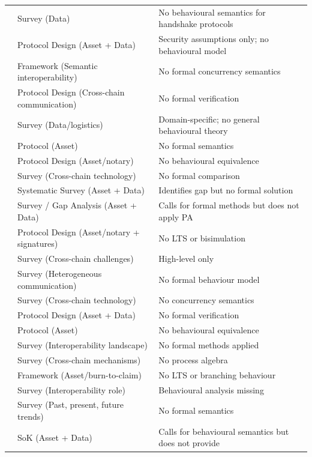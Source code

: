 \begin{longtable}[]{@{}lll@{}}
\citep{Bigiotti2025} & Survey (Data) & No behavioural semantics for
handshake protocols \\
\citep{Cheng_2024} & Protocol Design (Asset + Data) & Security
assumptions only; no behavioural model \\
\citep{sottomayor2024enterprise} & Framework (Semantic interoperability)
& No formal concurrency semantics \\
\citep{Mohammed_Abdul_2024} & Protocol Design (Cross-chain
communication) & No formal verification \\
\citep{Li_2024} & Survey (Data/logistics) & Domain-specific; no general
behavioural theory \\
\citep{Augusto_2023} & Protocol (Asset) & No formal semantics \\
\citep{Chen_2023} & Protocol Design (Asset/notary) & No behavioural
equivalence \\
\citep{Li_2023} & Survey (Cross-chain technology) & No formal
comparison \\
\citep{wang2023} & Systematic Survey (Asset + Data) & Identifies gap but
no formal solution \\
\citep{Belchior_2023} & Survey / Gap Analysis (Asset + Data) & Calls for
formal methods but does not apply PA \\
\citep{Wu_2023} & Protocol Design (Asset/notary + signatures) & No LTS
or bisimulation \\
\citep{Harris_2023} & Survey (Cross-chain challenges) & High-level
only \\
\citep{Kotey_2023} & Survey (Heterogeneous communication) & No formal
behaviour model \\
\citep{Mao_2023} & Survey (Cross-chain technology) & No concurrency
semantics \\
\citep{Wang_2022} & Protocol Design (Asset + Data) & No formal
verification \\
\citep{Sober_2022} & Protocol (Asset) & No behavioural equivalence \\
\citep{kang2022} & Survey (Interoperability landscape) & No formal
methods applied \\
\citep{Ou_2022} & Survey (Cross-chain mechanisms) & No process
algebra \\
\citep{Pillai_2022} & Framework (Asset/burn-to-claim) & No LTS or
branching behaviour \\
\citep{Lohachab_2021} & Survey (Interoperability role) & Behavioural
analysis missing \\
\citep{Belchior_2021} & Survey (Past, present, future trends) & No
formal semantics \\
\citep{wang2021sok} & SoK (Asset + Data) & Calls for behavioural
semantics but does not provide \\
\end{longtable}

